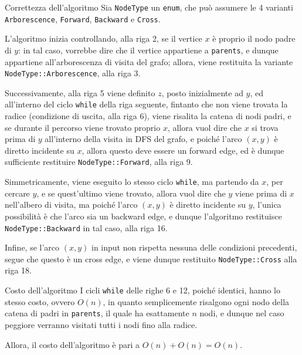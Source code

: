 \documentclass[a4paper, 12pt]{report}
\begin{document}
    \begin{framedobs}{Correttezza dell'algoritmo}
        Sia \texttt{NodeType} un \texttt{enum}, che può assumere le 4 varianti \texttt{Arborescence}, \texttt{Forward}, \texttt{Backward} e \texttt{Cross}.

        L'algoritmo inizia controllando, alla riga 2, se il vertice $x$ è proprio il nodo padre di $y$: in tal caso, vorrebbe dire che il vertice appartiene a \texttt{parents}, e dunque appartiene all'arborescenza di visita del grafo; allora, viene restituita la variante \texttt{NodeType::Arborescence}, alla riga 3.

        Successivamente, alla riga 5 viene definito $z$, posto inizialmente ad $y$, ed all'interno del ciclo \texttt{while} della riga seguente, fintanto che non viene trovata la radice (condizione di uscita, alla riga 6), viene risalita la catena di nodi padri, e se durante il percorso viene trovato proprio $x$, allora vuol dire che $x$ si trova prima di $y$ all'interno della visita in DFS del grafo, e poiché l'arco $(x, y)$ è diretto incidente su $x$, allora questo deve essere un forward edge, ed è dunque sufficiente restituire \texttt{NodeType::Forward}, alla riga 9.

        Simmetricamente, viene eseguito lo stesso ciclo \texttt{while}, ma partendo da $x$, per cercare $y$, e se quest'ultimo viene trovato, allora vuol dire che $y$ viene prima di $x$ nell'albero di visita, ma poiché l'arco $(x, y)$ è diretto incidente su $y$, l'unica possibilità è che l'arco sia un backward edge, e dunque l'algoritmo restituisce \texttt{NodeType::Backward} in tal caso, alla riga 16.

        Infine, se l'arco $(x, y)$ in input non rispetta nessuna delle condizioni precedenti, segue che questo è un cross edge, e viene dunque restituito \texttt{NodeType::Cross} alla riga 18.
    \end{framedobs}

    \begin{framedobs}{Costo dell'algoritmo}
        I cicli \texttt{while} delle righe 6 e 12, poiché identici, hanno lo stesso costo, ovvero $O(n)$, in quanto semplicemente risalgono ogni nodo della catena di padri in \texttt{parents}, il quale ha esattamente $n$ nodi, e dunque nel caso peggiore verranno visitati tutti i nodi fino alla radice.

        Allora, il costo dell'algoritmo è pari a $O(n) + O(n) = O(n)$.
    \end{framedobs}
\end{document}
